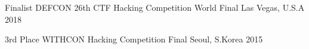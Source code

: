 
\begin{cvhonors}
\cvhonor
{Finalist} %
{DEFCON 26th CTF Hacking Competition World Final} %
{Las Vegas, U.S.A} %
{2018} %
\end{cvhonors}

\begin{cvhonors}
\cvhonor
{3rd Place} %
{WITHCON Hacking Competition Final} %
{Seoul, S.Korea} %
{2015} %
\end{cvhonors}
